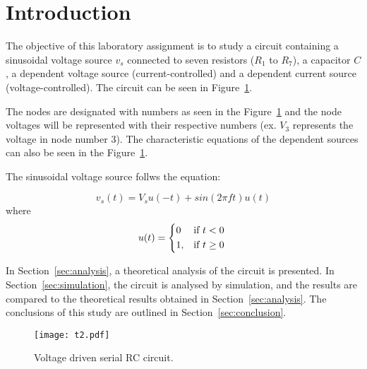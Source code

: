 \section{Introduction}
\label{sec:introduction}

The objective of this laboratory assignment is to study a circuit containing a
sinusoidal voltage source $v_s$ connected to seven resistors ($R_1$ to $R_7$), a capacitor $C$, a dependent voltage source (current-controlled) and a dependent current source (voltage-controlled).
The circuit can be seen in Figure~\ref{fig:t2}.

The nodes are designated with numbers as seen in the Figure~\ref{fig:t2} and the node voltages will be represented with their respective numbers (ex. $V_3$ represents the voltage in node number 3). The characteristic equations of the dependent sources can also be seen in the Figure~\ref{fig:t2}. 

The sinusoidal voltage source follws the equation:

\begin {equation}
	v_s( t )  = V_s u( -t ) + sin( 2 \pi f t ) u( t ) 
	\label{eq:vs}
\end{equation}
where 
\begin {equation}
	u( t ) =  
	\begin{cases*} 
	  0 & if $t < 0$ \\
	1, & if $t \geq 0$
	\end{cases*}
	\label{eq:ut}
\end{equation}


In Section~\ref{sec:analysis}, a theoretical analysis of the circuit is
presented. In Section~\ref{sec:simulation}, the circuit is analysed by
simulation, and the results are compared to the theoretical results obtained in
Section~\ref{sec:analysis}. The conclusions of this study are outlined in
Section~\ref{sec:conclusion}.

\begin{figure}[h] \centering
\texttt{[image: t2.pdf]}
\caption{Voltage driven serial RC circuit.}
\label{fig:t2}
\end{figure}

